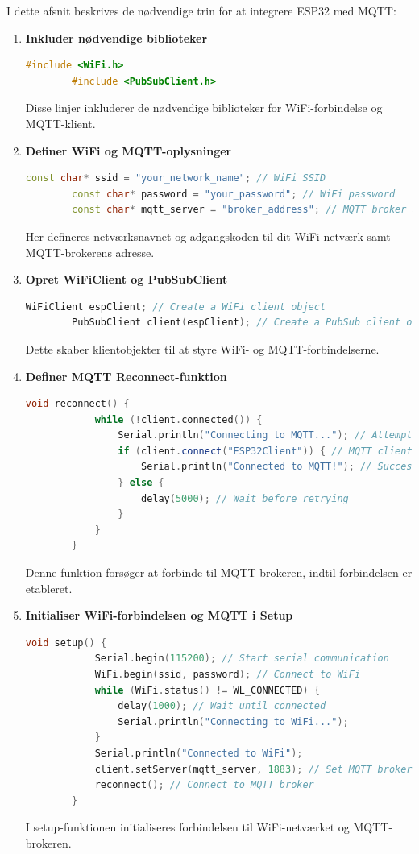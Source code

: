 I dette afsnit beskrives de nødvendige trin for at integrere ESP32 med MQTT:

\begin{enumerate}
	\item \textbf{Inkluder nødvendige biblioteker}
	\begin{lstlisting}[language=C++, caption=Syntaks]
		#include <WiFi.h>
		#include <PubSubClient.h>
	\end{lstlisting}
	Disse linjer inkluderer de nødvendige biblioteker for WiFi-forbindelse og MQTT-klient.
	
	\item \textbf{Definer WiFi og MQTT-oplysninger}
	\begin{lstlisting}[language=C++, caption=Syntaks]
		const char* ssid = "your_network_name"; // WiFi SSID
		const char* password = "your_password"; // WiFi password
		const char* mqtt_server = "broker_address"; // MQTT broker address
	\end{lstlisting}
	Her defineres netværksnavnet og adgangskoden til dit WiFi-netværk samt MQTT-brokerens adresse.
	
	\item \textbf{Opret WiFiClient og PubSubClient}
	\begin{lstlisting}[language=C++, caption=Syntaks]
		WiFiClient espClient; // Create a WiFi client object
		PubSubClient client(espClient); // Create a PubSub client object
	\end{lstlisting}
	Dette skaber klientobjekter til at styre WiFi- og MQTT-forbindelserne.
	
	\item \textbf{Definer MQTT Reconnect-funktion}
	\begin{lstlisting}[language=C++, caption=Syntaks]
		void reconnect() {
			while (!client.connected()) {
				Serial.println("Connecting to MQTT..."); // Attempt to connect to MQTT broker
				if (client.connect("ESP32Client")) { // MQTT client ID
					Serial.println("Connected to MQTT!"); // Success message
				} else {
					delay(5000); // Wait before retrying
				}
			}
		}
	\end{lstlisting}
	Denne funktion forsøger at forbinde til MQTT-brokeren, indtil forbindelsen er etableret.
	
	\item \textbf{Initialiser WiFi-forbindelsen og MQTT i Setup}
	\begin{lstlisting}[language=C++, caption=Syntaks]
		void setup() {
			Serial.begin(115200); // Start serial communication
			WiFi.begin(ssid, password); // Connect to WiFi
			while (WiFi.status() != WL_CONNECTED) {
				delay(1000); // Wait until connected
				Serial.println("Connecting to WiFi...");
			}
			Serial.println("Connected to WiFi");
			client.setServer(mqtt_server, 1883); // Set MQTT broker and port
			reconnect(); // Connect to MQTT broker
		}
	\end{lstlisting}
	I setup-funktionen initialiseres forbindelsen til WiFi-netværket og MQTT-brokeren.
	

\end{enumerate}
